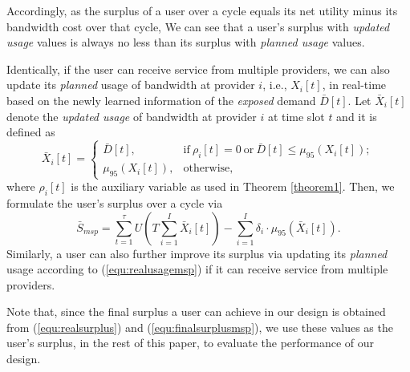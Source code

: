 \documentclass[10pt,journal,compsoc]{IEEEtran}
\begin{document}
Accordingly, as the surplus of a user over a  cycle equals its net utility minus its bandwidth cost over that cycle, We can see that a user's surplus with \emph{updated usage} values is always no less than its surplus with \emph{planned usage} values. 









\vspace{0.1cm}

Identically, if the user can receive service from multiple providers, we can also update its \emph{planned} usage of bandwidth at provider $i$, i.e., $X_i[t]$, in real-time based on the newly learned information of the  \emph{exposed} demand $\bar{D}[t]$. Let $\bar{X}_{i}[t]$ denote the \emph{updated usage} of bandwidth at provider $i$ at time slot $t$ and it is defined as
\begin{equation} \label{equ:realusagemsp}
\bar{X}_{i}[t]=
\begin{cases}
\bar{D}[t], &  \text{if} \ \rho_{i}[t]=0 \ \text{or} \ \bar{D}[t]\leq \mu_{95}(X_{i}[t]); \\
\mu_{95}(X_{i}[t]), & \text{otherwise},
\end{cases}
\end{equation}
where $\rho_{i}[t]$ is the auxiliary variable as used in Theorem \ref{theorem1}. Then, we formulate the user's   surplus over a  cycle  via
\begin{equation}\label{equ:finalsurplusmsp}
\bar{S}_{msp}=\sum_{t=1}^{\tau} {U(T\sum_{i=1}^{I} \bar{X}_{i}[t])}-\sum_{i=1}^{I} \delta_{i} \cdot \mu_{95}(\bar{X}_{i}[t]).
\end{equation}
Similarly, a user can also further improve its surplus via updating its \emph{planned} usage according to (\ref{equ:realusagemsp}) if it can receive service from multiple providers.

Note that, since the final surplus  a user can achieve in  our design is obtained from (\ref{equ:realsurplus}) and (\ref{equ:finalsurplusmsp}), we use these values as the user's surplus, in the rest of this paper, to evaluate the performance of our design.
\end{document}

